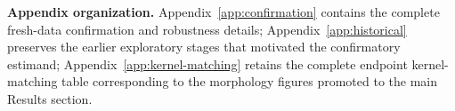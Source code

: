 \documentclass[10pt]{article}
\begin{document}


\clearpage
\appendix
\noindent\textbf{Appendix organization.} Appendix~\ref{app:confirmation} contains the complete fresh-data confirmation and robustness details; Appendix~\ref{app:historical} preserves the earlier exploratory stages that motivated the confirmatory estimand; Appendix~\ref{app:kernel-matching} retains the complete endpoint kernel-matching table corresponding to the morphology figures promoted to the main Results section.


\clearpage

\clearpage

\end{document}
